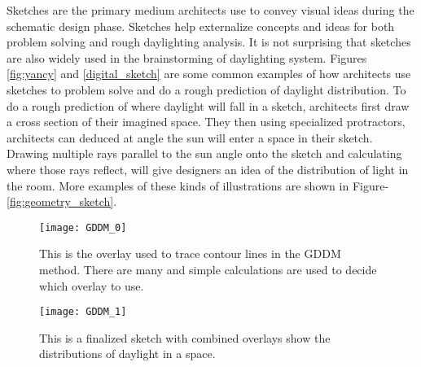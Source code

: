   Sketches are the primary medium architects use to convey visual ideas during the schematic design phase.
  Sketches help externalize concepts and ideas for both problem solving and rough daylighting analysis\cite{Suwa,yancy}.
  It is not surprising that sketches are also widely used in the brainstorming of daylighting system.
  Figures \ref{fig:yancy} and \ref{digital_sketch} are some common examples of how architects use sketches to problem solve and do a rough prediction of daylight distribution.
  To do a rough prediction of where daylight will fall in a sketch, architects first draw a cross section of their imagined space.
  They then using specialized protractors, architects can deduced at angle the sun will enter a space in their sketch\cite{james1976sun}.
  Drawing multiple rays parallel to the sun angle onto the sketch and calculating where those rays reflect, will give designers an idea of the distribution of light in the room.
  More examples of these kinds of illustrations are shown in Figure-\ref{fig:geometry_sketch}. \\

  \begin{figure}[h]
    \centering
    \begin{minipage}[b]{0.4\textwidth}
      \centering
      \texttt{[image: GDDM\_0]}
      \caption{This is the overlay used to trace contour lines in the GDDM method. There are many and simple calculations are used to decide which overlay to use.}
      \label{fig:GDDM_0}
    \end{minipage}
    \hfill
    \begin{minipage}[b]{0.4\textwidth}
      \centering
      \texttt{[image: GDDM\_1]}
      \caption{This is a finalized sketch with combined overlays show the distributions of daylight in a space.}
      \label{fig:GDDM_1}
    \end{minipage}
  \end{figure}

